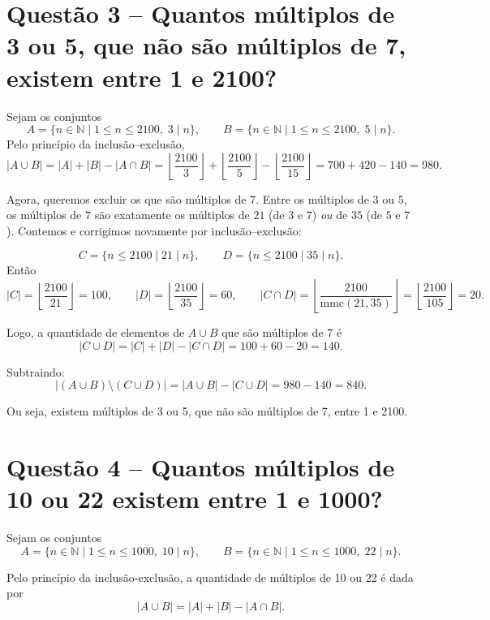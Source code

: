 \documentclass[12pt,a4paper]{article}
\begin{document}
\section*{Questão 3 -- Quantos múltiplos de 3 ou 5, que não são múltiplos de 7, existem entre 1 e 2100?}
    
    Sejam os conjuntos
    \[
    A=\{n\in\mathbb{N}\mid 1\le n\le 2100,\; 3\mid n\},\qquad
    B=\{n\in\mathbb{N}\mid 1\le n\le 2100,\; 5\mid n\}.
    \]
    Pelo princípio da inclusão–exclusão,
    \[
    |A\cup B| = |A|+|B|-|A\cap B|
    = \left\lfloor\frac{2100}{3}\right\rfloor
    + \left\lfloor\frac{2100}{5}\right\rfloor
    - \left\lfloor\frac{2100}{15}\right\rfloor
    = 700+420-140 = 980.
    \]
    
    Agora, queremos excluir os que são múltiplos de $7$. Entre os múltiplos de $3$ ou $5$, os múltiplos de $7$ são exatamente os múltiplos de $21$ (de $3$ e $7$) \emph{ou} de $35$ (de $5$ e $7$). Contemos e corrigimos novamente por inclusão–exclusão:
    
    \[
    C=\{n\le 2100\mid 21\mid n\},\qquad
    D=\{n\le 2100\mid 35\mid n\}.
    \]
    Então
    \[
    |C|=\left\lfloor\frac{2100}{21}\right\rfloor=100,\qquad
    |D|=\left\lfloor\frac{2100}{35}\right\rfloor=60,\qquad
    |C\cap D|=\left\lfloor\frac{2100}{\mathrm{mmc}(21,35)}\right\rfloor
    =\left\lfloor\frac{2100}{105}\right\rfloor=20.
    \]

    \vspace{0.5cm}

    Logo, a quantidade de elementos de $A\cup B$ que são múltiplos de $7$ é
    \[
    |C\cup D|=|C|+|D|-|C\cap D|=100+60-20=140.
    \]
    
    Subtraindo:
    \[
    |(A\cup B)\setminus (C\cup D)|=|A\cup B|-|C\cup D|
    =980-140=\boxed{840}.
    \]
    
    Ou seja, existem  múltiplos de 3 ou 5, que não são múltiplos de 7, entre 1 e 2100.

\section*{Questão 4 -- Quantos múltiplos de 10 ou 22 existem entre 1 e 1000?}

    Sejam os conjuntos
    \[
    A=\{n\in\mathbb{N}\mid 1\le n\le 1000,\; 10\mid n\},\qquad
    B=\{n\in\mathbb{N}\mid 1\le n\le 1000,\; 22\mid n\}.
    \]
    
    Pelo princípio da inclusão-exclusão, a quantidade de múltiplos de 10 ou 22 é dada por
    \[
    |A\cup B| = |A| + |B| - |A\cap B|.
    \]
    
\end{document}

